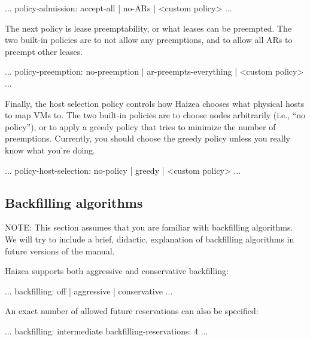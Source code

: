 \begin{wideshellverbatim}
[scheduling]
...
policy-admission: accept-all | no-ARs | <custom policy>
...
\end{wideshellverbatim}

The next policy is lease preemptability, or what leases can be preempted. The two built-in policies are to not allow any preemptions, and to allow all ARs to preempt other leases.

\begin{wideshellverbatim}
[scheduling]
...
policy-preemption: no-preemption | ar-preempts-everything | <custom policy>
...
\end{wideshellverbatim}

Finally, the host selection policy controls how Haizea chooses what physical hosts to map VMs to. The two built-in policies are to choose nodes arbitrarily (i.e., ``no policy''), or to apply a greedy policy that tries to minimize the number of preemptions. Currently, you should choose the greedy policy unless you really know what you're doing.

\begin{wideshellverbatim}
[scheduling]
...
policy-host-selection: no-policy | greedy | <custom policy>
...
\end{wideshellverbatim}


\subsection{Backfilling algorithms}

\begin{warning}
NOTE: This section assumes that you are familiar with backfilling algorithms. We will try to include a brief, didactic, explanation of backfilling algorithms in future versions of the manual.
\end{warning}

Haizea supports both aggressive and conservative backfilling:

\begin{wideshellverbatim}
[scheduling]
...
backfilling: off | aggressive | conservative
...
\end{wideshellverbatim}

An exact number of allowed future reservations can also be specified:

\begin{wideshellverbatim}
[scheduling]
...
backfilling: intermediate
backfilling-reservations: 4
...
\end{wideshellverbatim}


